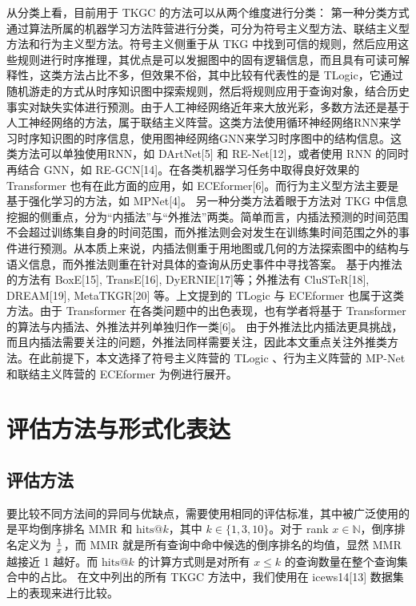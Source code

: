 \documentclass[a4paper, AutoFakeBold]{article}
\begin{document}
从分类上看，目前用于 TKGC 的方法可以从两个维度进行分类：
第一种分类方式通过算法所属的机器学习方法阵营进行分类，可分为符号主义型方法、联结主义型方法和行为主义型方法。符号主义侧重于从 TKG 中找到可信的规则，然后应用这些规则进行时序推理，其优点是可以发掘图中的固有逻辑信息，而且具有可读可解释性，这类方法占比不多，但效果不俗，其中比较有代表性的是 TLogic，它通过随机游走的方式从时序知识图中探索规则，然后将规则应用于查询对象，结合历史事实对缺失实体进行预测。由于人工神经网络近年来大放光彩，多数方法还是基于人工神经网络的方法，属于联结主义阵营。这类方法使用循环神经网络RNN来学习时序知识图的时序信息，使用图神经网络GNN来学习时序图中的结构信息。这类方法可以单独使用RNN，如 DArtNet[5] 和 RE-Net[12]，或者使用 RNN 的同时再结合 GNN，如 RE-GCN[14]。在各类机器学习任务中取得良好效果的 Transformer 也有在此方面的应用，如 ECEformer[6]。而行为主义型方法主要是基于强化学习的方法，如 MPNet[4]。
另一种分类方法着眼于方法对 TKG 中信息挖掘的侧重点，分为“内插法”与“外推法”两类。简单而言，内插法预测的时间范围不会超过训练集自身的时间范围，而外推法则会对发生在训练集时间范围之外的事件进行预测。从本质上来说，内插法侧重于用地图或几何的方法探索图中的结构与语义信息，而外推法则重在针对具体的查询从历史事件中寻找答案。
基于内推法的方法有 BoxE[15], TransE[16], DyERNIE[17]等；外推法有 CluSTeR[18], DREAM[19], MetaTKGR[20] 等。上文提到的 TLogic 与 ECEformer 也属于这类方法。由于 Transformer 在各类问题中的出色表现，也有学者将基于 Transformer 的算法与内插法、外推法并列单独归作一类[6]。
由于外推法比内插法更具挑战，而且内插法需要关注的问题，外推法同样需要关注，因此本文重点关注外推类方法。在此前提下，本文选择了符号主义阵营的 TLogic 、行为主义阵营的 MP-Net 和联结主义阵营的 ECEformer 为例进行展开。


\section{评估方法与形式化表达}

\subsection{评估方法}

要比较不同方法间的异同与优缺点，需要使用相同的评估标准，其中被广泛使用的是平均倒序排名 MMR 和 $\text{hits}@k$，其中 $k\in\{1,3,10\}$。对于 rank $x\in{\mathbb N}$，倒序排名定义为 $1\over x$，而 MMR 就是所有查询中命中候选的倒序排名的均值，显然 MMR 越接近 1 越好。而 $\text{hits}@k$ 的计算方式则是对所有 $x\le k$ 的查询数量在整个查询集合中的占比。 在文中列出的所有 TKGC 方法中，我们使用在 icews14[13] 数据集上的表现来进行比较。
\end{document}
